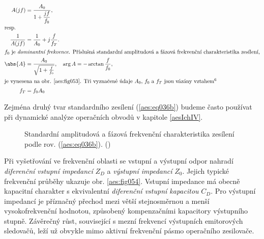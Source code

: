         \begin{subequations}\label{aes:eq036}
          \begin{align}
            A(jf)   &= \dfrac{A_0}{1 + \dfrac{jf}{f_0}},                  \label{aes:eq036a}  \\
            \shortintertext{resp.}   
            \dfrac{1}{A(jf)} &=  \dfrac{1}{A_0} + j\dfrac{f}{f_T}.        \label{aes:eq036b}  \\
            \shortintertext{\(f_0\) je \emph{dominantní frekvence}. Příslušná standardní amplitudová 
                            a fázová frekvenční charakteristika zesílení,}
            \abs{A} &= \dfrac{A_0}{\sqrt{1 + \frac{f}{f_0}}}, \quad 
                      \arg{A} = - \arctan\dfrac{f}{f_0},                  \label{aes:eq036c}  \\ 
            \shortintertext{je vynesena na obr. \ref{aes:fig053}. Tři vyznačené údaje \(A_0\), 
                            \(f_0\) a \(f_T\) jsou vázány vztahem\footnotemark[6]}
            f_T &= f_0A_0                                                 \label{aes:eq036d}
          \end{align}
        \end{subequations}

        Zejména druhý tvar standardního zesílení (\ref{aes:eq036b}) budeme často používat při
        dynamické analýze operačních obvodů v kapitole \ref{aesIchIV}.

        \begin{figure}[ht!] %
          \centering
          \caption{Standardní amplitudová a fázová frekvenční charakteristika zesílení podle rov.
                  (\ref{aes:eq036b}). (\cite[s.~25]{Dostal})}
          \label{aes:fig053}
        \end{figure}  

        Při vyšetřování ve frekvenční oblasti se vstupní a výstupní odpor nahradí \emph{diferenční
        vstupní impedancí} \(Z_D\) a \emph{výstupní impedancí} \(Z_0\). Jejich typické frekvenční
        průběhy ukazuje obr. \ref{aes:fig054}. Vstupní impedance má obecně kapacitní charakter s
        ekvivalentní \emph{diferenční vstupní kapacitou} \(C_D\). Pro výstupní impedancí je
        příznačný přechod mezi větší stejnosměrnou a menší vysokofrekvenční hodnotou, způsobený
        kompenzačními kapacitory výstupního stupně. Závěrečný růst, související s mezní frekvencí
        výstupních emitorových sledovačů, leží už obvykle mimo aktivní frekvenční pásmo operačního
        zesilovače.

